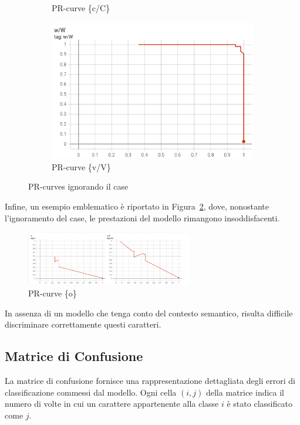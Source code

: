 \begin{figure}[htbp]
\begin{subfigure}[t]{0.32\textwidth}
        \caption{PR-curve \{c/C\}}
    \end{subfigure}
    \begin{subfigure}[t]{0.32\textwidth}
        \centering
        \includegraphics[width=\textwidth]{images/pr_ignore3.png}
        \caption{PR-curve \{v/V\}}
    \end{subfigure}
    \caption{PR-curves ignorando il case}
    \label{fig:pr-ignore}
\end{figure}

Infine, un esempio emblematico è riportato in Figura~\ref{fig:pr_strange}, dove, nonostante l'ignoramento del case, le prestazioni del modello rimangono insoddisfacenti.

\begin{figure}[htbp]
    \centering
    \includegraphics[width=0.65\textwidth]{images/pr_strange.png}
    \caption{PR-curve \{o\}}
    \label{fig:pr_strange}
\end{figure}

In assenza di un modello che tenga conto del contesto semantico, risulta difficile discriminare correttamente questi caratteri.

\subsection{Matrice di Confusione}

La matrice di confusione fornisce una rappresentazione dettagliata degli errori di classificazione commessi dal modello. Ogni cella \((i, j)\) della matrice indica il numero di volte in cui un carattere appartenente alla classe \(i\) è stato classificato come \(j\).


